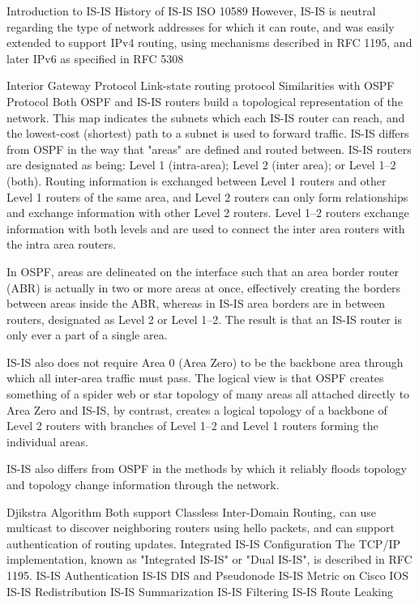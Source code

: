 
Introduction to IS-IS
    History of IS-IS
        ISO 10589
        However, IS-IS is neutral regarding the type of network addresses for which it can route, and was easily extended to support IPv4 routing, using mechanisms described in RFC 1195, and later IPv6 as specified in RFC 5308
        
    Interior Gateway Protocol
    Link-state routing protocol
    Similarities with OSPF Protocol
        Both OSPF and IS-IS routers build a topological representation of the network. This map indicates the subnets which each IS-IS router can reach, and the lowest-cost (shortest) path to a subnet is used to forward traffic.
        IS-IS differs from OSPF in the way that "areas" are defined and routed between. IS-IS routers are designated as being: Level 1 (intra-area); Level 2 (inter area); or Level 1–2 (both). Routing information is exchanged between Level 1 routers and other Level 1 routers of the same area, and Level 2 routers can only form relationships and exchange information with other Level 2 routers. Level 1–2 routers exchange information with both levels and are used to connect the inter area routers with the intra area routers.

        In OSPF, areas are delineated on the interface such that an area border router (ABR) is actually in two or more areas at once, effectively creating the borders between areas inside the ABR, whereas in IS-IS area borders are in between routers, designated as Level 2 or Level 1–2. The result is that an IS-IS router is only ever a part of a single area.

        IS-IS also does not require Area 0 (Area Zero) to be the backbone area through which all inter-area traffic must pass. The logical view is that OSPF creates something of a spider web or star topology of many areas all attached directly to Area Zero and IS-IS, by contrast, creates a logical topology of a backbone of Level 2 routers with branches of Level 1–2 and Level 1 routers forming the individual areas.

        IS-IS also differs from OSPF in the methods by which it reliably floods topology and topology change information through the network.
        
    Djikstra Algorithm
        Both support Classless Inter-Domain Routing, can use multicast to discover neighboring routers using hello packets, and can support authentication of routing updates.
Integrated IS-IS Configuration
     The TCP/IP implementation, known as "Integrated IS-IS" or "Dual IS-IS", is described in RFC 1195.
IS-IS Authentication
IS-IS DIS and Pseudonode
IS-IS Metric on Cisco IOS
IS-IS Redistribution
IS-IS Summarization
IS-IS Filtering
IS-IS Route Leaking

